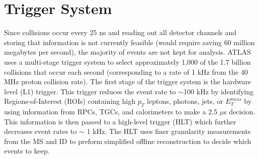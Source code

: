 \section{Trigger System}
Since collisions occur every 25 ns and reading out all detector channels and storing that information is not currently feasible (would require saving 60 million megabytes per second), the majority of events are not kept for analysis. ATLAS uses a multi-stage trigger system to select approximately 1,000 of the 1.7 billion collisions that occur each second (corresponding to a rate of 1 kHz from the 40 MHz proton collision rate). The first stage of the trigger system is the hardware level (L1) trigger. This trigger reduces the event rate to $\sim$100 kHz by identifying Regions-of-Interest (ROIs) containing high $p_{T}$ leptons, photons, jets, or $E_{T}^{miss}$ by using information from RPCs, TGCs, and calorimeters to make a 2.5 $\mu$s decision. This information is then passed to a high-level trigger (HLT) which further decreases event rates to $\sim$ 1 kHz. The HLT uses finer granularity measurements from the MS and ID to preform simplified offline reconstruction to decide which events to keep.
